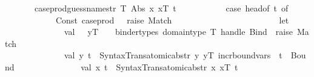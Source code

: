 \begin{isabellebody}
\ \ \ \ \ \ {\isacharbar}{\kern0pt}\ case{\isacharunderscore}{\kern0pt}prod{\isacharunderscore}{\kern0pt}guess{\isacharunderscore}{\kern0pt}names{\isacharunderscore}{\kern0pt}tr{\isacharprime}{\kern0pt}\ T\ {\isacharbrackleft}{\kern0pt}Abs\ {\isacharparenleft}{\kern0pt}x{\isacharcomma}{\kern0pt}\ xT{\isacharcomma}{\kern0pt}\ t{\isacharparenright}{\kern0pt}{\isacharbrackright}{\kern0pt}\ {\isacharequal}{\kern0pt}\isanewline
\ \ \ \ \ \ \ \ \ \ {\isacharparenleft}{\kern0pt}case\ {\isacharparenleft}{\kern0pt}head{\isacharunderscore}{\kern0pt}of\ t{\isacharparenright}{\kern0pt}\ of\isanewline
\ \ \ \ \ \ \ \ \ \ \ \ Const\ {\isacharparenleft}{\kern0pt}\isactrlconstUNDERSCOREsyntax {\isasymopen}case{\isacharunderscore}{\kern0pt}prod{\isasymclose}{\isacharcomma}{\kern0pt}\ {\isacharunderscore}{\kern0pt}{\isacharparenright}{\kern0pt}\ {\isacharequal}{\kern0pt}{\isachargreater}{\kern0pt}\ raise\ Match\isanewline
\ \ \ \ \ \ \ \ \ \ {\isacharbar}{\kern0pt}\ {\isacharunderscore}{\kern0pt}\ {\isacharequal}{\kern0pt}{\isachargreater}{\kern0pt}\isanewline
\ \ \ \ \ \ \ \ \ \ \ \ let\isanewline
\ \ \ \ \ \ \ \ \ \ \ \ \ \ val\ {\isacharparenleft}{\kern0pt}{\isacharunderscore}{\kern0pt}\ {\isacharcolon}{\kern0pt}{\isacharcolon}{\kern0pt}\ yT\ {\isacharcolon}{\kern0pt}{\isacharcolon}{\kern0pt}\ {\isacharunderscore}{\kern0pt}{\isacharparenright}{\kern0pt}\ {\isacharequal}{\kern0pt}\ binder{\isacharunderscore}{\kern0pt}types\ {\isacharparenleft}{\kern0pt}domain{\isacharunderscore}{\kern0pt}type\ T{\isacharparenright}{\kern0pt}\ handle\ Bind\ {\isacharequal}{\kern0pt}{\isachargreater}{\kern0pt}\ raise\ Match{\isacharsemicolon}{\kern0pt}\isanewline
\ \ \ \ \ \ \ \ \ \ \ \ \ \ val\ {\isacharparenleft}{\kern0pt}y{\isacharcomma}{\kern0pt}\ t{\isacharprime}{\kern0pt}{\isacharparenright}{\kern0pt}\ {\isacharequal}{\kern0pt}\ Syntax{\isacharunderscore}{\kern0pt}Trans{\isachardot}{\kern0pt}atomic{\isacharunderscore}{\kern0pt}abs{\isacharunderscore}{\kern0pt}tr{\isacharprime}{\kern0pt}\ {\isacharparenleft}{\kern0pt}{\isachardoublequote}{\kern0pt}y{\isachardoublequote}{\kern0pt}{\isacharcomma}{\kern0pt}\ yT{\isacharcomma}{\kern0pt}\ incr{\isacharunderscore}{\kern0pt}boundvars\ {}\ t\ {\isachardollar}{\kern0pt}\ Bound\ {}{\isacharparenright}{\kern0pt}{\isacharsemicolon}{\kern0pt}\isanewline
\ \ \ \ \ \ \ \ \ \ \ \ \ \ val\ {\isacharparenleft}{\kern0pt}x{\isacharprime}{\kern0pt}{\isacharcomma}{\kern0pt}\ t{\isacharprime}{\kern0pt}{\isacharprime}{\kern0pt}{\isacharparenright}{\kern0pt}\ {\isacharequal}{\kern0pt}\ Syntax{\isacharunderscore}{\kern0pt}Trans{\isachardot}{\kern0pt}atomic{\isacharunderscore}{\kern0pt}abs{\isacharunderscore}{\kern0pt}tr{\isacharprime}{\kern0pt}\ {\isacharparenleft}{\kern0pt}x{\isacharcomma}{\kern0pt}\ xT{\isacharcomma}{\kern0pt}\ t{\isacharprime}{\kern0pt}{\isacharparenright}{\kern0pt}{\isacharsemicolon}{\kern0pt}\isanewline

\end{isabellebody}

